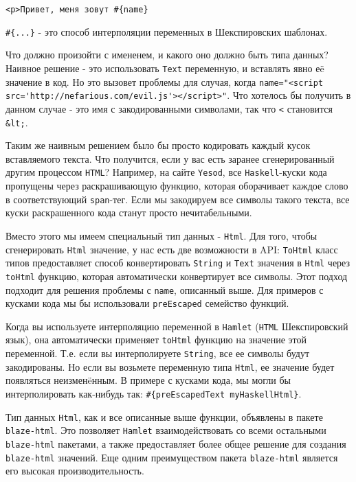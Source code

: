 \begin{lstlisting}
<p>Привет, меня зовут #{name}
\end{lstlisting}

\begin{remark}
    \lstinline!#{...}! - это способ интерполяции переменных в Шекспировских шаблонах.
\end{remark}

Что должно произойти с имененем, и какого оно должно быть типа данных?  Наивное
решение - это использовать \lstinline!Text! переменную, и вставлять явно еë
значение в код.  Но это вызовет проблемы для случая, когда
\lstinline!name="<script src='http://nefarious.com/evil.js'></script>"!.  Что
хотелось бы получить в данном случае - это имя с закодированными символами, так
что \lstinline!<! становится \lstinline!&lt;!.

Таким же наивным решением было бы просто кодировать каждый кусок вставляемого
текста. Что получится, если у вас есть заранее сгенерированный другим процессом
\texttt{HTML}? Например, на сайте \texttt{Yesod}, все \texttt{Haskell}-куски
кода пропущены через раскрашивающую функцию, которая оборачивает каждое слово в
соответствующий \texttt{span}-тег. Если мы закодируем все символы такого
текста, все куски раскрашенного кода станут просто нечитабельными.

Вместо этого мы имеем специальный тип данных - \lstinline!Html!. Для того,
чтобы сгенерировать \lstinline!Html! значение, у нас есть две возможности в
API: \lstinline!ToHtml! класс типов предоставляет способ конвертировать
\lstinline!String! и \lstinline!Text! значения в \lstinline!Html! через
\lstinline!toHtml! функцию, которая автоматически конвертирует все символы.
Этот подход подходит для решения проблемы с \texttt{name}, описанный выше. Для
примеров с кусками кода мы бы использовали \lstinline!preEscaped!  семейство
функций.

Когда вы используете интерполяцию переменной в \texttt{Hamlet} (\texttt{HTML}
Шекспировский язык), она автоматически применяет \lstinline!toHtml! функцию на
значение этой переменной. Т.е. если вы интерполируете \lstinline!String!, все
ее символы будут закодированы. Но если вы возьмете переменную типа
\lstinline!Html!, ее значение будет появляться неизменëнным. В примере с
кусками кода, мы могли бы интерполировать как-нибудь так:
\lstinline!#{preEscapedText myHaskellHtml}!.

\begin{remark}
    Тип данных \lstinline!Html!, как и все описанные выше функции, объявлены в
    пакете \texttt{blaze-html}. Это позволяет \texttt{Hamlet} взаимодействовать
    со всеми остальными \texttt{blaze-html} пакетами, а также предоставляет
    более общее решение для создания \texttt{blaze-html} значений.  Еще одним
    преимуществом пакета \texttt{blaze-html} является его высокая
    производительность.
\end{remark}

